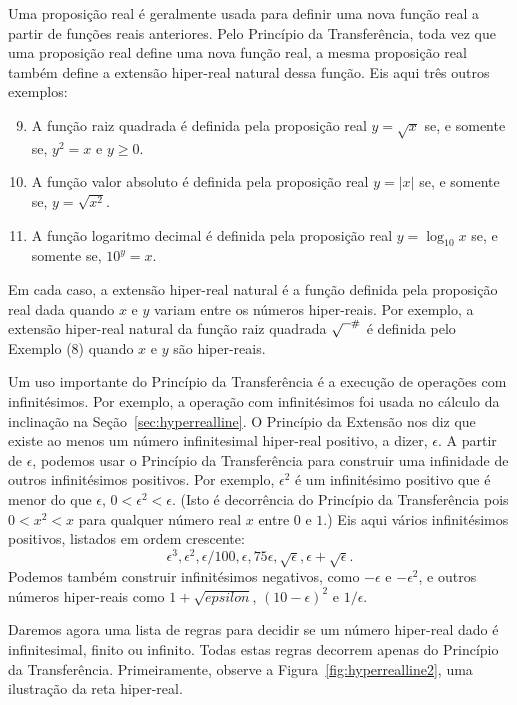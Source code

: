 Uma proposição real é geralmente usada para definir uma nova função real
a partir de funções reais anteriores. Pelo Princípio da Transferência,
toda vez que uma proposição real define uma nova função real, a mesma
proposição real também define a extensão hiper-real natural dessa função.
Eis aqui três outros exemplos:
\begin{enumerate}[(1)]
\setcounter{enumi}{8}
\item A função raiz quadrada é definida pela proposição real $y = \sqrt{x}$
      se, e somente se, $y^2 = x$ e $y \ge 0$.
\item A função valor absoluto é definida pela proposição real $y = |x|$
      se, e somente se, $y = \sqrt{x^2}$.
\item A função logaritmo decimal é definida pela proposição real
      $y = \log_{10} x$ se, e somente se, $10^y = x$.
\end{enumerate}
Em cada caso, a extensão hiper-real natural é a função definida pela
proposição real dada quando $x$ e $y$ variam entre os números
hiper-reais. Por exemplo, a extensão hiper-real natural da função
raiz quadrada ${\sqrt{\phantom{x}}}^\#$ é definida pelo Exemplo (8) quando
$x$ e $y$ são hiper-reais.

Um uso importante do Princípio da Transferência é a execução de operações
com infinitésimos. Por exemplo, a operação com infinitésimos foi usada
no cálculo da inclinação na Seção~\ref{sec:hyperrealline}. O Princípio da
Extensão nos diz que existe ao menos um número infinitesimal hiper-real
positivo, a dizer, $\epsilon$. A partir de $\epsilon$, podemos usar o
Princípio da Transferência para construir uma infinidade de outros
infinitésimos positivos. Por exemplo, $\epsilon^2$ é um infinitésimo
positivo que é menor do que $\epsilon$, $0 < \epsilon^2 < \epsilon$.
(Isto é decorrência do Princípio da Transferência pois $0 < x^2 < x$
para qualquer número real $x$ entre $0$ e $1$.) Eis aqui vários infinitésimos
positivos, listados em ordem crescente:
$$
  \epsilon^3, \epsilon^2, \epsilon/100, \epsilon, 75\epsilon,
  \sqrt{\epsilon}, \epsilon + \sqrt{\epsilon}.
$$
Podemos também construir infinitésimos negativos, como $-\epsilon$ e
$-\epsilon^2$, e outros números hiper-reais como $1 + \sqrt{epsilon}$,
$(10 - \epsilon)^2$ e $1/\epsilon$.

Daremos agora uma lista de regras para decidir se um número hiper-real
dado é infinitesimal, finito ou infinito. Todas estas regras decorrem
apenas do Princípio da Transferência. Primeiramente, observe a
Figura~\ref{fig:hyperrealline2}, uma ilustração da reta hiper-real.

